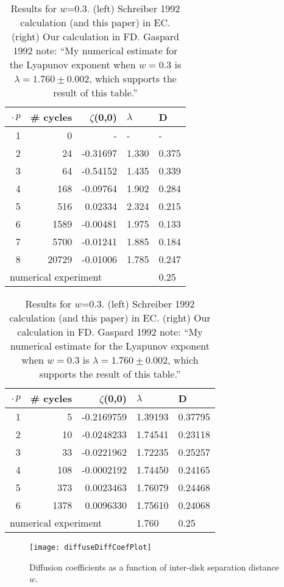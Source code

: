 \documentclass[aps,pre,preprint,groupedaddress,floatfix]{revtex4-1}
\begin{document}
\begin{table}[htbp]
{\small
\begin{tabular}{|r|r|r|l|l|}
\hline
$\period{p}$ & \# cycles & $\zeta$(0,0) & $\lambda$ & D \\ \hline\hline
1      & 0      &   -    &   -  &   - \\
2      & 24     & -0.31697 & 1.330 & 0.375\\
3      & 64     & -0.54152 & 1.435 & 0.339\\
4      & 168    & -0.09764 & 1.902 & 0.284\\
5      & 516    &  0.02334 & 2.324 & 0.215\\
6      & 1589   & -0.00481 & 1.975 & 0.133\\
7      & 5700   & -0.01241 & 1.885 & 0.184\\
8      & 20729  & -0.01006 & 1.785 & 0.247\\ \hline\hline
\multicolumn{4}{|l|}{numerical experiment} 1.760 & 0.25 \\ \hline
\end{tabular}
\hfill
\begin{tabular}{|r|r|r|l|l|}
\hline
$\period{p}$ & \# cycles & $\zeta$(0,0) & $\lambda$ & D \\ \hline\hline
1      & 5      &   -0.2169759    &   1.39193  &   0.37795 \\
2      & 10     & -0.0248233 & 1.74541 & 0.23118\\
3      & 33     & -0.0221962 & 1.72235 & 0.25257\\
4      & 108    & -0.0002192 & 1.74450 & 0.24165\\
5      & 373    &  0.0023463 & 1.76079 & 0.24468\\
6      & 1378   &  0.0096330 & 1.75610 & 0.24068\\ \hline\hline
\multicolumn{3}{|l|}{numerical experiment}
                           & 1.760 & 0.25
\\ \hline
\end{tabular}
}

\caption{\label{TCELL2}
Results for $w$=0.3. (left) Schreiber 1992 calculation (and
this paper) in EC. (right) Our calculation in FD. Gaspard 1992
note: ``My numerical estimate for the Lyapunov exponent when $w=0.3$ is
$\lambda = 1.760 \pm 0.002$, which supports the result of this table.''
}
\end{table}

\begin{figure}
\texttt{[image: diffuseDiffCoefPlot]}
\caption[]{\label{fig-results} Diffusion coefficients as a function of inter-disk separation distance $w$.}
\end{figure}
\end{document}

